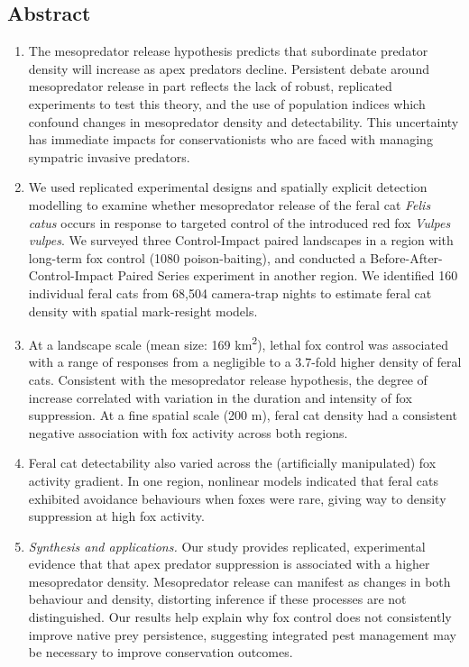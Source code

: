 \documentclass[11pt,a4paper,titlepage,twoside,openright]{style/unimelbthesis}
\begin{document}
\begin{mainmatter}
{\section*{Abstract}\label{abstract-2}}
\begin{enumerate}
\def\labelenumi{\arabic{enumi}.}
\item
  The mesopredator release hypothesis predicts that subordinate predator density will increase as apex predators decline. Persistent debate around mesopredator release in part reflects the lack of robust, replicated experiments to test this theory, and the use of population indices which confound changes in mesopredator density and detectability. This uncertainty has immediate impacts for conservationists who are faced with managing sympatric invasive predators.
\item
  We used replicated experimental designs and spatially explicit detection modelling to examine whether mesopredator release of the feral cat \emph{Felis catus} occurs in response to targeted control of the introduced red fox \emph{Vulpes vulpes}. We surveyed three Control-Impact paired landscapes in a region with long-term fox control (1080 poison-baiting), and conducted a Before-After-Control-Impact Paired Series experiment in another region. We identified 160 individual feral cats from 68,504 camera-trap nights to estimate feral cat density with spatial mark-resight models.
\item
  At a landscape scale (mean size: 169 km\textsuperscript{2}), lethal fox control was associated with a range of responses from a negligible to a 3.7-fold higher density of feral cats. Consistent with the mesopredator release hypothesis, the degree of increase correlated with variation in the duration and intensity of fox suppression. At a fine spatial scale (200 m), feral cat density had a consistent negative association with fox activity across both regions.
\item
  Feral cat detectability also varied across the (artificially manipulated) fox activity gradient. In one region, nonlinear models indicated that feral cats exhibited avoidance behaviours when foxes were rare, giving way to density suppression at high fox activity.
\item
  \emph{Synthesis and applications.} Our study provides replicated, experimental evidence that that apex predator suppression is associated with a higher mesopredator density. Mesopredator release can manifest as changes in both behaviour and density, distorting inference if these processes are not distinguished. Our results help explain why fox control does not consistently improve native prey persistence, suggesting integrated pest management may be necessary to improve conservation outcomes.
\end{enumerate}
\newpage


\end{mainmatter}
\end{document}
